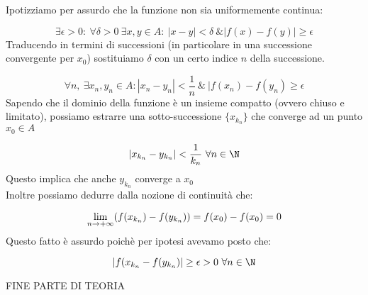\documentclass[../analisi.tex]{subfiles}
\begin{document}
\begin{dimo}[Facoltativa]
Ipotizziamo per assurdo \Lightning che la funzione non sia uniformemente continua:


\begin{equation}
	\exists \epsilon > 0:\ \forall \delta > 0\ \exists x,y \in A:\
	| x - y | < \delta\ \& | f(x) - f(y) | \geq \epsilon
\end{equation}
Traducendo in termini di successioni (in particolare in una successione convergente
per $x_0$) sostituiamo $\delta$ con un certo indice $n$ della successione.

\begin{equation}
	\forall n,\ \exists x_n, y_n \in A: | x_n - y_n | < \frac{1}{n}\ \&\
	| f (x_n) - f(y_n) \geq \epsilon
\end{equation}
Sapendo che il dominio della funzione è un insieme compatto (ovvero chiuso e
limitato), possiamo estrarre una sotto-successione $\{x_{k_n} \}$ che converge
ad un punto $x_0 \in A $

\begin{equation}
	| x_{k_n} - y_{k_n} | < \frac{1}{k_n}\ \forall n \in \N
\end{equation}
Questo implica che anche $y_{k_n}$ converge a $x_0$\\
Inoltre possiamo dedurre dalla nozione di continuità che:

\begin{equation}
	\lim \limits_{n \to + \infty} ( f(x_{k_n} ) - f(y_{k_n}) ) = f(x_0) - f(x_0) = 0
\end{equation}
Questo fatto è assurdo poichè per ipotesi avevamo posto che: 

\begin{equation}
	| f(x_{k_n} - f(y_{k_n}) | \geq \epsilon > 0\ \forall n \in \N 
\end{equation}


\end{dimo}

\begin{center}
	\LARGE FINE PARTE DI TEORIA
\end{center}
\end{document}
